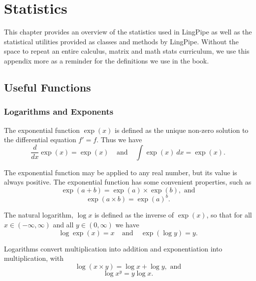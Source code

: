 \chapter{Statistics}\label{chapter:stats}

This chapter provides an overview of the statistics used in LingPipe
as well as the statistical utilities provided as classes and methods
by LingPipe.  Without the space to repeat an entire calculus, matrix
and math stats curriculum, we use this appendix more as a reminder for
the definitions we use in the book.

\section{Useful Functions}


\subsection{Logarithms and Exponents}

The exponential function $\exp(x)$ is defined as the unique non-zero
solution to the differential equation $f' = f$.  Thus we have
%
\begin{equation}
\frac{d}{dx}\exp(x) = \exp(x)
\ \ \ \ \ \mbox{and} \ \ \ \ \ 
\int \exp(x) \ dx = \exp(x).
\end{equation}

The exponential function may be applied to any real number, but its
value is always positive.  The exponential function has some
convenient properties, such as
%
\begin{equation}
\exp(a + b) = \exp(a) \times \exp(b), \mbox{ and}
\end{equation}
%
\begin{equation}
\exp(a \times b) = \exp(a)^b.
\end{equation}

The natural logarithm, $\log x$ is defined as the inverse of $\exp(x)$,
so that for all $x \in (-\infty,\infty)$ and all $y \in (0,\infty)$ we have
%
\begin{equation}
\log \exp(x) = x
\ \ \ \ \ \mbox{and} \ \ \ \ \ 
\exp(\log y) = y.
\end{equation}
%

Logarithms convert multiplication into addition and exponentiation
into multiplication, with
%
\begin{equation}
\log (x \times y) = \log x + \log y, \mbox{ and}
\end{equation}
%
\begin{equation}
\log x^y = y \log x.
\end{equation}



